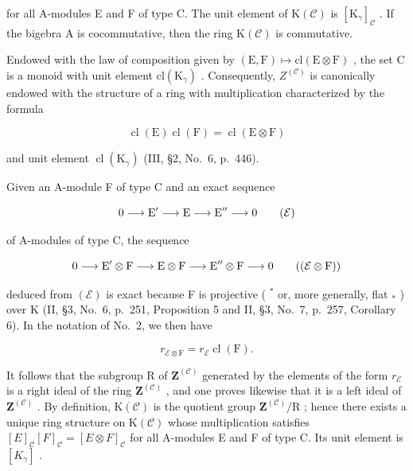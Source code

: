for all A-modules E and F of type C. The unit element of \(\mathrm{K}(\mathcal{C})\) is \([\mathrm{K}_{\gamma}]_{\mathcal{C}}\) . If the bigebra A is cocommutative, then the ring \(\mathrm{K}(\mathcal{C})\) is commutative.

Endowed with the law of composition given by \((\mathrm{E},\mathrm{F})\mapsto\mathrm{cl}(\mathrm{E}\otimes\mathrm{F})\) , the set C is a monoid with unit element \(\mathrm{cl}(\mathrm{K}_{\gamma})\) . Consequently, \(Z^{(\mathcal{C})}\) is canonically endowed with the structure of a ring with multiplication characterized by the formula

\[
\operatorname{cl} (\mathrm{E}) \operatorname{cl} (\mathrm{F}) = \operatorname{cl} (\mathrm{E} \otimes \mathrm{F})\tag{13}
\]

and unit element \(\operatorname{cl}(\mathrm{K}_{\gamma})\) (III, §2, No.~6, p.~446).

Given an A-module F of type C and an exact sequence

\[
0 \longrightarrow \mathrm{E} ^ {\prime} \longrightarrow \mathrm{E} \longrightarrow \mathrm{E} ^ {\prime \prime} \longrightarrow 0\tag{\( \mathcal{E} \)}
\]

of A-modules of type C, the sequence

\[
0 \longrightarrow \mathrm{E} ^ {\prime} \otimes \mathrm{F} \longrightarrow \mathrm{E} \otimes \mathrm{F} \longrightarrow \mathrm{E} ^ {\prime \prime} \otimes \mathrm{F} \longrightarrow 0\tag{\(\left(\mathcal{E}\otimes \mathrm{F}\right)\)}
\]

deduced from \((\mathcal{E})\) is exact because F is projective ( \(^{*}\) or, more generally, flat \(_{*}\) ) over K (II, §3, No.~6, p.~251, Proposition 5 and II, §3, No.~7, p.~257, Corollary 6). In the notation of No.~2, we then have

\[
r _ {\mathcal {E} \otimes \mathrm{F}} = r _ {\mathcal {E}} \operatorname{cl} (\mathrm{F}).\tag{14}
\]

It follows that the subgroup R of \(\mathbf{Z}^{(\mathcal{C})}\) generated by the elements of the form \(r_{\mathcal{E}}\) is a right ideal of the ring \(\mathbf{Z}^{(\mathcal{C})}\) , and one proves likewise that it is a left ideal of \(\mathbf{Z}^{(\mathcal{C})}\) . By definition, \(\mathrm{K}(\mathcal{C})\) is the quotient group \(\mathbf{Z}^{(\mathcal{C})}/\mathrm{R}\) ; hence there exists a unique ring structure on \(\mathrm{K}(\mathcal{C})\) whose multiplication satisfies \([E]_{\mathcal{C}}[F]_{\mathcal{C}} = [E \otimes F]_{\mathcal{C}}\) for all A-modules E and F of type C. Its unit element is \([K_{\gamma}]\) .

